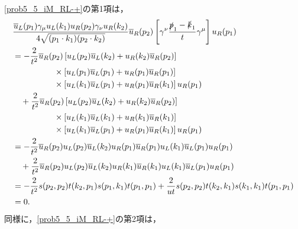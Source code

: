 \eqref{prob5_5_iM_RL-+}の第1項は，
\begin{align}
  \begin{split}
    & \frac{\overline{u}_L(p_1)\gamma_\mu u_L(k_1) u_R(p_2)\gamma_\nu u_R(k_2)}{4\sqrt{(p_1 \cdot k_1)(p_2 \cdot k_2)}} \overline{u}_R(p_2)
    \left[ \gamma^\nu \frac{\slashed{p}_1 - \slashed{k}_1}{t} \gamma^\mu \right] u_R(p_1) \\
    &= -\frac{2}{t^2} \overline{u}_R(p_2) \left[ u_L(p_2)\overline{u}_L(k_2) + u_R(k_2)\overline{u}_R(p_2) \right] \\
    &\qquad\qquad\quad\times \left[ u_L(p_1)\overline{u}_L(p_1) + u_R(p_1)\overline{u}_R(p_1) \right] \\
    &\qquad\qquad\quad\times \left[ u_L(k_1)\overline{u}_L(p_1) + u_R(p_1)\overline{u}_R(k_1) \right] u_R(p_1) \\
    &\quad +\frac{2}{t^2} \overline{u}_R(p_2) \left[ u_L(p_2)\overline{u}_L(k_2) + u_R(k_2)\overline{u}_R(p_2) \right] \\
    &\qquad\qquad\quad\times \left[ u_L(k_1)\overline{u}_L(k_1) + u_R(k_1)\overline{u}_R(k_1) \right] \\
    &\qquad\qquad\quad\times \left[ u_L(k_1)\overline{u}_L(p_1) + u_R(p_1)\overline{u}_R(k_1) \right] u_R(p_1) \\
    &= -\frac{2}{t^2} \overline{u}_R(p_2) u_L(p_2)\overline{u}_L(k_2) u_R(p_1)\overline{u}_R(p_1) u_L(k_1)\overline{u}_L(p_1) u_R(p_1) \\
    &\quad +\frac{2}{t^2} \overline{u}_R(p_2) u_L(p_2)\overline{u}_L(k_2) u_R(k_1)\overline{u}_R(k_1) u_L(k_1)\overline{u}_L(p_1) u_R(p_1) \\
    &= -\frac{2}{t^2} s(p_2, p_2) t(k_2, p_1) s(p_1, k_1) t(p_1, p_1) + \frac{2}{ut} s(p_2, p_2) t(k_2, k_1) s(k_1, k_1) t(p_1, p_1) \\
    &= 0 .
  \end{split}
  \label{prob5_5_iM_RL-+_term1}
\end{align}
同様に，\eqref{prob5_5_iM_RL-+}の第2項は，
